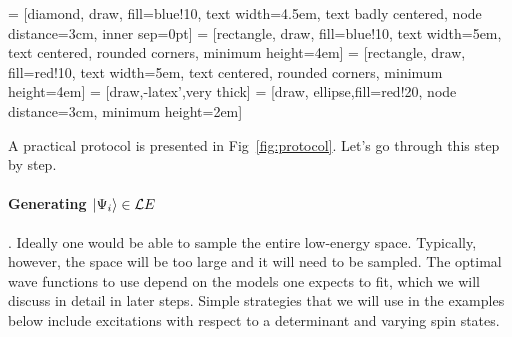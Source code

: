 = [diamond, draw, fill=blue!10, 
    text width=4.5em, text badly centered, node distance=3cm, inner sep=0pt]
 = [rectangle, draw, fill=blue!10, 
    text width=5em, text centered, rounded corners, minimum height=4em]
 = [rectangle, draw, fill=red!10, 
    text width=5em, text centered, rounded corners, minimum height=4em]
 = [draw,-latex',very thick]
 = [draw, ellipse,fill=red!20, node distance=3cm,
    minimum height=2em]
\begin{figure*}
\caption{A practical protocol for fitting effective models to {\it ab initio} data.}
\label{fig:protocol} 
\end{figure*}

A practical protocol is presented in Fig~\ref{fig:protocol}. 
Let's go through this step by step.

\paragraph{Generating $\ket{\Psi_i}\in {\mathcal LE}$}. 
Ideally one would be able to sample the entire low-energy space. 
Typically, however, the space will be too large and it will need to be sampled. 
The optimal wave functions to use depend on the models one expects to fit, which we will discuss in detail  in later steps. 
Simple strategies that we will use in the examples below include excitations with respect to a determinant and varying spin states.


